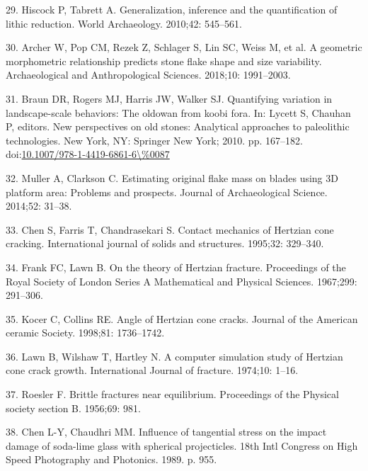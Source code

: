 \documentclass[10pt,letterpaper]{article}
\newenvironment{cslreferences}%
  {}%
  {\par}
\begin{document}
\begin{cslreferences}
\leavevmode\hypertarget{ref-hiscock_generalization_2010}{}%
29. Hiscock P, Tabrett A. Generalization, inference and the
quantification of lithic reduction. World Archaeology. 2010;42:
545--561.

\leavevmode\hypertarget{ref-archer_geometric_2018}{}%
30. Archer W, Pop CM, Rezek Z, Schlager S, Lin SC, Weiss M, et al. A
geometric morphometric relationship predicts stone flake shape and size
variability. Archaeological and Anthropological Sciences. 2018;10:
1991--2003.

\leavevmode\hypertarget{ref-Braun2010}{}%
31. Braun DR, Rogers MJ, Harris JW, Walker SJ. Quantifying variation in
landscape-scale behaviors: The oldowan from koobi fora. In: Lycett S,
Chauhan P, editors. New perspectives on old stones: Analytical
approaches to paleolithic technologies. New York, NY: Springer New York;
2010. pp. 167--182.
doi:\href{https://doi.org/10.1007/978-1-4419-6861-6/\%0087}{10.1007/978-1-4419-6861-6\textbackslash\%0087}

\leavevmode\hypertarget{ref-muller_estimating_2014}{}%
32. Muller A, Clarkson C. Estimating original flake mass on blades using
3D platform area: Problems and prospects. Journal of Archaeological
Science. 2014;52: 31--38.

\leavevmode\hypertarget{ref-chen_contact_1995}{}%
33. Chen S, Farris T, Chandrasekari S. Contact mechanics of Hertzian
cone cracking. International journal of solids and structures. 1995;32:
329--340.

\leavevmode\hypertarget{ref-frank_theory_1967}{}%
34. Frank FC, Lawn B. On the theory of Hertzian fracture. Proceedings of
the Royal Society of London Series A Mathematical and Physical Sciences.
1967;299: 291--306.

\leavevmode\hypertarget{ref-kocer_angle_1998}{}%
35. Kocer C, Collins RE. Angle of Hertzian cone cracks. Journal of the
American ceramic Society. 1998;81: 1736--1742.

\leavevmode\hypertarget{ref-lawn_computer_1974}{}%
36. Lawn B, Wilshaw T, Hartley N. A computer simulation study of
Hertzian cone crack growth. International Journal of fracture. 1974;10:
1--16.

\leavevmode\hypertarget{ref-roesler_brittle_1956}{}%
37. Roesler F. Brittle fractures near equilibrium. Proceedings of the
Physical society section B. 1956;69: 981.

\leavevmode\hypertarget{ref-chen_influence_1989}{}%
38. Chen L-Y, Chaudhri MM. Influence of tangential stress on the impact
damage of soda-lime glass with spherical projecticles. 18th Intl
Congress on High Speed Photography and Photonics. 1989. p. 955.


\end{cslreferences}
\end{document}
